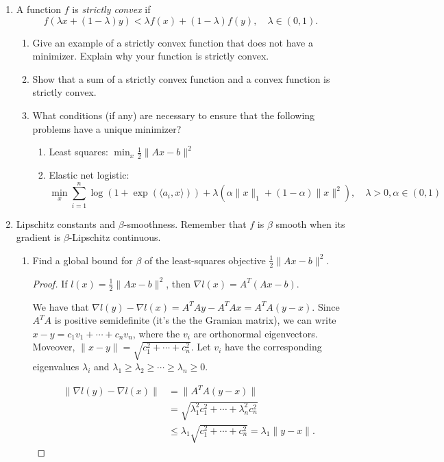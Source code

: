 \documentclass[11pt]{amsart}
\begin{document}
\begin{enumerate}
\bigskip\bigskip


\item A function $f$ is {\it strictly convex} if 
\[
f(\lambda x + (1-\lambda)y) < \lambda f(x) + (1-\lambda) f(y), \quad \lambda \in (0,1).
\]
\begin{enumerate}
\item Give an example of a strictly convex function that 
does not have a minimizer. Explain why your function is strictly convex. 
\item Show that a sum of a strictly convex function and a convex function is strictly convex. 
\item What conditions (if any) are necessary to ensure that the following problems have a unique minimizer?  
\begin{enumerate}
\item Least squares: $\min_x \frac{1}{2}\|Ax - b\|^2$
\item Elastic net logistic: 
\[
\min_x \sum_{i=1}^n \log(1 + \exp(\langle a_i, x\rangle)) + \lambda(\alpha \|x\|_1 + (1-\alpha)\|x\|^2), \quad \lambda>0, \alpha \in (0,1)
\]
\end{enumerate}
\end{enumerate}
\bigskip\bigskip



\item Lipschitz constants and $\beta$-smoothness. Remember that $f$ is $\beta$ smooth when 
its gradient is $\beta$-Lipschitz continuous.   
\begin{enumerate}
\item Find a global bound for $\beta$ of the least-squares objective $\frac{1}{2}\|Ax-b\|^2$.
  \begin{proof}
    If $l(x) = \frac{1}{2}\|Ax-b\|^2$, then $\nabla l(x) = A^T\left(Ax - b\right)$.
    
    We have that $\nabla l(y) - \nabla l(x) = A^TAy - A^TAx = A^TA(y -
    x)$. Since $A^TA$ is positive semidefinite (it's the the Gramian matrix), we
    can write $x - y = c_1v_1 + \cdots + c_nv_n$, where the $v_i$ are
    orthonormal eigenvectors. Moveover,
    $\lVert x - y \rVert = \sqrt{c_1^2 + \cdots + c_n^2}$. Let $v_i$ have the
    corresponding eigenvalues $\lambda_i$ and
    $\lambda_1 \geq \lambda_2 \geq \cdots \geq \lambda_n \geq 0$.
    
    \begin{align*}
      \lVert \nabla l(y) - \nabla l(x) \rVert
      &= \lVert A^TA(y - x) \rVert \\
      &= \sqrt{\lambda_1^2c_1^2 + \cdots + \lambda_n^2c_n^2} \\
      &\leq \lambda_1 \sqrt{c_1^2 + \cdots + c_n^2} = \lambda_1\lVert y - x \rVert.
    \end{align*}


\end{proof}
\end{enumerate}
\end{enumerate}
\end{document}
